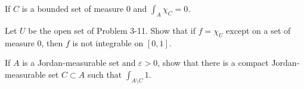 \documentclass[12 pt, letterpaper]{hmcpset}
\begin{document}
\pagebreak

\begin{problem}[17.]
	If $C$ is a bounded set of measure $0$ and $\int_{A} \chi_{C} = 0$.
\end{problem}

\pagebreak

\begin{problem}[19.]
	Let $U$ be the open set of Problem 3-11. Show that if $f = \chi_{U}$ except on a set of measure $0$, then $f$ is not integrable on $[0, 1]$.
\end{problem}

\pagebreak

\begin{problem}[22.]
	If $A$ is a Jordan-measurable set and $\varepsilon > 0$, show that there is a compact Jordan-measurable set $C \subset A$ such that $\int_{A \setminus C} 1$.
\end{problem}
\end{document}
